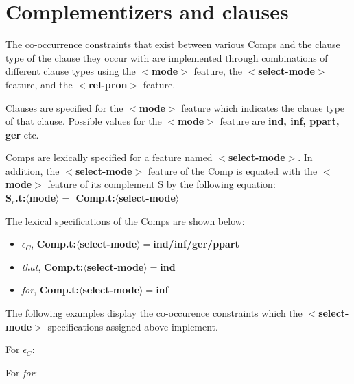 \section{Complementizers and clauses} 
The co-occurrence constraints that exist between various Comps 
and the clause type of the clause they occur with are 
implemented through combinations of different 
clause types using the {\bf $<$mode$>$} feature, the {\bf $<$select-mode$>$} 
feature, and the {\bf $<$rel-pron$>$} feature. 
 
Clauses are specified for the {\bf $<$mode$>$} feature which indicates 
the clause type of that clause. Possible values for the {\bf $<$mode$>$} 
feature are {\bf ind, inf, ppart, ger} etc. 
 
Comps are lexically specified for a feature named {\bf $<$select-mode$>$}. 
In addition, the {\bf $<$select-mode$>$} feature of the Comp is 
equated with the  {\bf $<$mode$>$} feature of its complement S by the following equation:\\ 
{\bf S$_{r}$.t:$\langle$mode$\rangle =$ Comp.t:$\langle$select-mode$\rangle$} 
 
The lexical specifications of the Comps are shown below: 
\begin{itemize} 
\item $\epsilon$$_{C}$, {\bf Comp.t:$\langle$select-mode$\rangle =$ind/inf/ger/ppart} 
\item {\em that}, {\bf Comp.t:$\langle$select-mode$\rangle =$ind} 
\item {\em for}, {\bf Comp.t:$\langle$select-mode$\rangle =$inf} 
\end{itemize} 
 
The following examples display the co-occurence constraints which 
the {\bf $<$select-mode$>$} specifications assigned above implement. 
 
For $\epsilon$$_{C}$: 
\beginsentences
{}\label{ex:478} 
\label{ex:479} 
\label{ex:480} 
\label{ex:481} 
\endsentences

 
For {\em for}: 
\beginsentences
{}\label{ex:482} 
\label{ex:483} 
\label{ex:484} 
\label{ex:485} 
\endsentences

